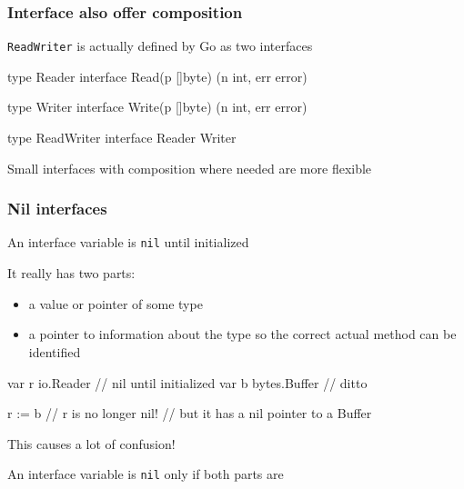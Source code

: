 \documentclass[handout,compress,t,11pt]{beamer}
\begin{document}
\begin{frame}[fragile]
    \frametitle{Interface also offer composition}
    \verb|ReadWriter| is actually defined by Go as two interfaces \par
\begin{golang}
type Reader interface {
    Read(p []byte) (n int, err error)
}

type Writer interface {
    Write(p []byte) (n int, err error)
}

type ReadWriter interface {
    Reader
    Writer
}
\end{golang}
    \vspace{\baselineskip}
    Small interfaces with composition where needed are more flexible \par
\end{frame}

\begin{frame}[fragile]
    \frametitle{Nil interfaces}
    An interface variable is \verb|nil| until initialized \par
    \vspace{0.4\baselineskip}
    It really has two parts:
    \begin{itemize}
        \item a value or pointer of some type
        \item a pointer to information about the type so
              the correct actual method can be identified
    \end{itemize}
\begin{golang}
var r io.Reader     // nil until initialized
var b bytes.Buffer  // ditto

r := b              // r is no longer nil!
                    // but it has a nil pointer to a Buffer
\end{golang}
    \vspace{0.2\baselineskip}
    This causes a lot of confusion! \par
    \vspace{0.2\baselineskip}
    An interface variable is \verb|nil| only if both parts are
\end{frame}
\end{document}
